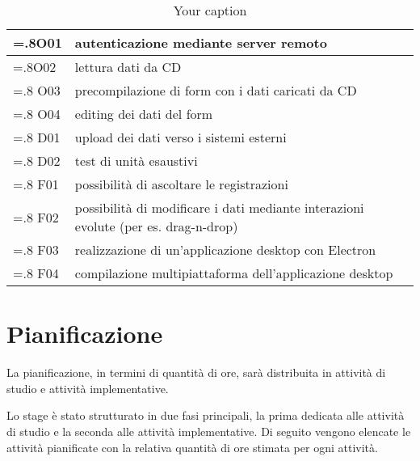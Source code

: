 \begin{table}
  \caption{Your caption}
  \label{tab:table}
  \centering
  \begin{tabularx}{\linewidth}{|>{\hsize=.8\hsize}X|>{\hsize=1.2\hsize}X|}
    \toprule
    \hline
    O01 & autenticazione mediante server remoto                                               \\
    \hline
    O02 & lettura dati da CD                                                                  \\
    \hline
    O03 & precompilazione di form con i dati caricati da CD                                   \\
    \hline
    O04 & editing dei dati del form                                                           \\
    \hline
    D01 & upload dei dati verso i sistemi esterni                                             \\
    \hline
    D02 & test di unità esaustivi                                                             \\
    \hline
    F01 & possibilità di ascoltare le registrazioni                                           \\
    \hline
    F02 & possibilità di modificare i dati mediante interazioni evolute (per es. drag-n-drop) \\
    \hline
    F03 & realizzazione di un’applicazione desktop con Electron                               \\
    \hline
    F04 & compilazione multipiattaforma dell’applicazione desktop                             \\
    \hline
  \end{tabularx}
\end{table}

\section{Pianificazione}

La pianificazione, in termini di quantità di ore, sarà distribuita in attività di studio e attività implementative.

Lo stage è stato strutturato in due fasi principali, la prima dedicata alle attività di studio e la seconda alle attività implementative. Di seguito vengono elencate le attività pianificate con la relativa quantità di ore stimata per ogni attività.

